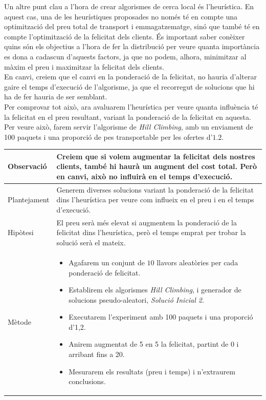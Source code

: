 \documentclass[a4paper]{article}
\begin{document}
	Un altre punt clau a l'hora de crear algorismes de cerca local és l'heurística. En aquest cas, una de les heurístiques proposades no només té en compte una optimització del preu total de transport i emmagatzematge, sinó que també té en compte l'optimització de la felicitat dels clients. És important saber conèixer quins són els objectius a l'hora de fer la distribució per veure quanta importància es dona a cadascun d'aquests factors, ja que no podem, alhora, minimitzar al màxim el preu i maximitzar la felicitat dels clients. \\
	
	En canvi, creiem que el canvi en la ponderació de la felicitat, no hauria d'alterar gaire el temps d'execució de l'algorisme, ja que el recorregut de solucions que hi ha de fer hauria de ser semblant. \\
	
	Per comprovar tot això, ara avaluarem l'heurística per veure quanta influència té la felicitat en el preu resultant, variant la ponderació de la felicitat en aquesta. Per veure això, farem servir l'algorisme de \textit{Hill Climbing}, amb un enviament de 100 paquets i una proporció de pes transportable per les ofertes d'$1.2$.
	
	\begin{table}[H]
		\centering
		\begin{tabular}{|l|p{10cm}|}
			\hline
			Observació & Creiem que si volem augmentar la felicitat dels nostres clients, també hi haurà un augment del cost total. Però en canvi, això no influirà en el temps d'execució. \\
			\hline
			Plantejament & Generem diverses solucions variant la ponderació de la felicitat dins l'heurística per veure com influeix en el preu i en el temps d'execució. \\
			\hline
			Hipòtesi & El preu serà més elevat si augmentem la ponderació de la felicitat dins l'heurística, però el temps emprat per trobar la solució serà el mateix. \\
			\hline
			Mètode & 
			\begin{itemize}
				\item Agafarem un conjunt de $10$ llavors aleatòries per cada ponderació de felicitat.
				\item Establirem els algorismes \textit{Hill Climbing}, i generador de solucions pseudo-aleatori, \textit{Solució Inicial 2}.
				\item Executarem l'experiment amb 100 paquets i una proporció d'1,2.
				\item Anirem augmentat de 5 en 5 la felicitat, partint de 0 i arribant fins a 20.
				\item Mesurarem els resultats (preu i temps) i n'extraurem conclusions.
			\end{itemize} \\
			\hline
		\end{tabular}
		\label{tab:exp6_apartats}
	\end{table}
	
\end{document}
